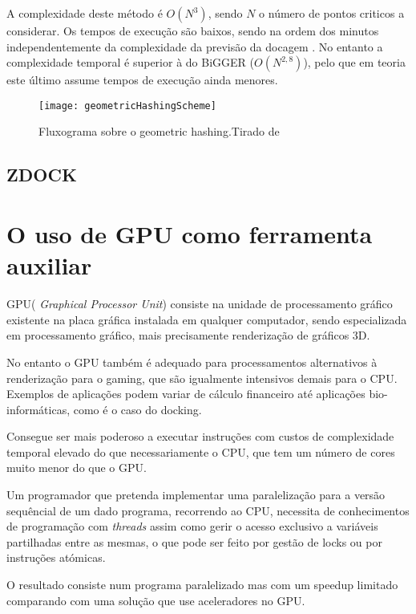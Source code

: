 A complexidade deste método é $O(N^{3})$, sendo $N$ o número de pontos criticos a considerar. Os tempos de execução são baixos, sendo na ordem dos minutos independentemente da complexidade da previsão da docagem \cite{halperin}. No entanto a complexidade temporal é superior à do BiGGER ($O(N^{2,8})$), pelo que em teoria este último assume tempos de execução ainda menores.

\begin{figure}[ht]
  \centering
    {\texttt{[image: geometricHashingScheme]}}
  \caption{Fluxograma sobre o geometric hashing.Tirado de \cite{geometry}}
  \label{geometricFig}
\end{figure}
\subsection{ZDOCK}

\section{ O uso de GPU como ferramenta auxiliar}
\label{gpus}
GPU( \textit{Graphical Processor Unit}) consiste na unidade de processamento gráfico existente na placa gráfica instalada em qualquer computador, sendo especializada em processamento gráfico, mais precisamente renderização de gráficos 3D. 

 No entanto o GPU também é adequado para processamentos alternativos à renderização para o gaming, que são igualmente intensivos demais para o CPU. Exemplos de aplicações podem variar de cálculo financeiro até aplicações bio-informáticas, como é o caso do docking.
 
Consegue ser mais poderoso a executar instruções com custos de complexidade temporal elevado do que necessariamente o CPU, que tem um número de cores muito menor do que o GPU. \cite{nvidia2011nvidia}

 Um programador que  pretenda implementar uma paralelização para a versão sequêncial de um dado programa, recorrendo ao CPU, necessita de conhecimentos de programação com \textit{threads} assim como gerir o acesso exclusivo a variáveis partilhadas entre as mesmas, o que pode ser feito por gestão de locks ou por instruções atómicas. 
 
 O resultado consiste num programa paralelizado mas com um speedup limitado comparando com uma solução que use aceleradores no GPU.
 
